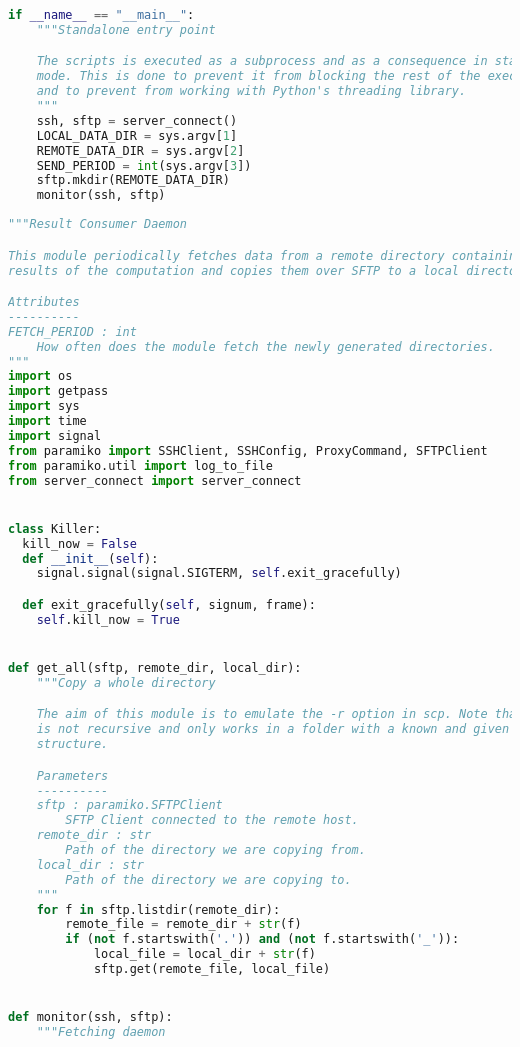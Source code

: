 \begin{lstlisting}[language=Python,caption={Implementation of the \texttt{producer} service.},label=code:producer]
if __name__ == "__main__":
    """Standalone entry point

    The scripts is executed as a subprocess and as a consequence in standalone
    mode. This is done to prevent it from blocking the rest of the execution
    and to prevent from working with Python's threading library.
    """
    ssh, sftp = server_connect()
    LOCAL_DATA_DIR = sys.argv[1]
    REMOTE_DATA_DIR = sys.argv[2]
    SEND_PERIOD = int(sys.argv[3])
    sftp.mkdir(REMOTE_DATA_DIR)
    monitor(ssh, sftp)
\end{lstlisting}

\begin{lstlisting}[language=Python,caption={Implementation of the \texttt{consumer} service.},label=code:consumer]
"""Result Consumer Daemon

This module periodically fetches data from a remote directory containing the
results of the computation and copies them over SFTP to a local directory.

Attributes
----------
FETCH_PERIOD : int
    How often does the module fetch the newly generated directories.
"""
import os
import getpass
import sys
import time
import signal
from paramiko import SSHClient, SSHConfig, ProxyCommand, SFTPClient
from paramiko.util import log_to_file
from server_connect import server_connect


class Killer:
  kill_now = False
  def __init__(self):
    signal.signal(signal.SIGTERM, self.exit_gracefully)

  def exit_gracefully(self, signum, frame):
    self.kill_now = True


def get_all(sftp, remote_dir, local_dir):
    """Copy a whole directory

    The aim of this module is to emulate the -r option in scp. Note that this
    is not recursive and only works in a folder with a known and given
    structure.

    Parameters
    ----------
    sftp : paramiko.SFTPClient
        SFTP Client connected to the remote host.
    remote_dir : str
        Path of the directory we are copying from.
    local_dir : str
        Path of the directory we are copying to.
    """
    for f in sftp.listdir(remote_dir):
        remote_file = remote_dir + str(f)
        if (not f.startswith('.')) and (not f.startswith('_')):
            local_file = local_dir + str(f)
            sftp.get(remote_file, local_file)


def monitor(ssh, sftp):
    """Fetching daemon


\end{lstlisting}
